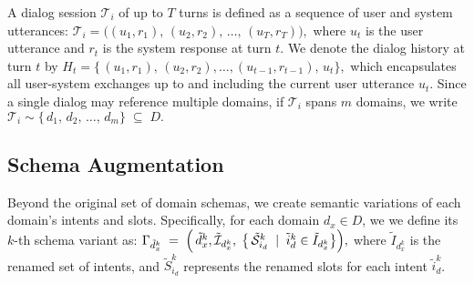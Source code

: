 A dialog session $\mathcal{T}_i$ of up to $T$ turns is defined as a sequence of user and system utterances:
\(
   \mathcal{T}_i = \bigl((u_1,r_1),\,(u_2,r_2),\,\dots,\,(u_T,r_T)\bigr),
\)
where $u_t$ is the user utterance and $r_t$ is the system response at turn $t$. 
We denote the dialog history at turn $t$ by
\(
   H_t = \{\,(u_1,r_1),\,(u_2,r_2),\dots,(u_{t-1},r_{t-1}),\,u_t\},
\)
which encapsulates all user-system exchanges up to and including the current user utterance \(u_t\). 
Since a single dialog may reference multiple domains, if \(\mathcal{T}_i\) spans \(m\) domains, we write \(\mathcal{T}_i \sim \{\,d_1,\,d_2,\,\dots,\,d_m\} \;\subseteq\; D.
\)



\vspace{-3pt}
\subsection{Schema Augmentation}
Beyond the original set of domain schemas, we create semantic variations of each domain’s intents and slots. Specifically, for each domain \(d_x \in D\), we we define its \(k\)-th schema variant as:
\(
\Gamma_{\tilde{d}^k_x} 
\;=\;
\Bigl(\, \tilde{d}^k_x,
  \tilde{\mathcal{I}}_{d^k_x},\;
  \bigl\{\,
    \tilde{\mathcal{S}}_{i_d}^k
    \;\mid\;
    \tilde{i}_d^k \in \tilde{I}_{d^k_x}
  \bigr\}
\Bigr),
\)
where $\tilde{I}_{d^k_x}$ is the renamed set of intents, and $\tilde{S}_{i_d}^k$ represents the renamed slots for each intent $\tilde{i}_d^k$. 

